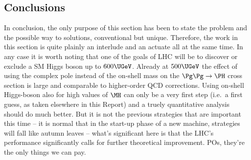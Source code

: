 \subsection{Conclusions}
In conclusion, the only purpose of this section has been to state the problem 
and the possible way to solutions, conventional but unique.
Therefore, the work in this section is quite plainly an interlude and an 
actuate all at the same time. In any case it is worth noting that one of 
the goals of LHC will be to discover or exclude a SM Higgs boson up to 
$600\UGeV$. 
Already at $500\UGeV$ the effect of using the complex pole instead of 
the on-shell mass on the $\Pg\Pg \to \PH$ cross section is large and comparable 
to higher-order QCD corrections.
Using on-shell Higgs-boson also for high values of $\MH$ can only be a very 
first step (i.e.\ a first guess, as taken elsewhere in this Report) and 
a truely quantitative analysis should do much better. 
But it is not the previous strategies that are important this time -- it is 
normal that in the start-up phase of a new machine, strategies will fall 
like autumn leaves -- what's significant here is that the LHC's performance 
significantly calls for further theoretical improvement. POs, they're the 
only things we can pay. 

\clearpage















